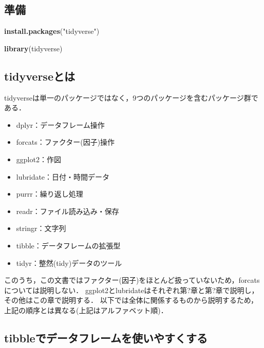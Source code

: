 \documentclass[
]{article}
\newenvironment{Shaded}{\begin{snugshade}}{\end{snugshade}}
\newcommand{\FunctionTok}[1]{\textcolor[rgb]{0.13,0.29,0.53}{\textbf{#1}}}
\newcommand{\NormalTok}[1]{#1}
\newcommand{\StringTok}[1]{\textcolor[rgb]{0.31,0.60,0.02}{#1}}
\providecommand{\tightlist}{%
  \setlength{\itemsep}{0pt}\setlength{\parskip}{0pt}}
\begin{document}
\hypertarget{ux6e96ux5099-1}{%
\subsection{準備}\label{ux6e96ux5099-1}}

\begin{Shaded}
\begin{Highlighting}[]
\FunctionTok{install.packages}\NormalTok{(}\StringTok{"tidyverse"}\NormalTok{)}
\end{Highlighting}
\end{Shaded}

\begin{Shaded}
\begin{Highlighting}[]
\FunctionTok{library}\NormalTok{(tidyverse)}
\end{Highlighting}
\end{Shaded}

\hypertarget{tidyverseux3068ux306f}{%
\subsection{tidyverseとは}\label{tidyverseux3068ux306f}}

tidyverseは単一のパッケージではなく，9つのパッケージを含むパッケージ群である．

\begin{itemize}
\tightlist
\item
  dplyr：データフレーム操作
\item
  forcats：ファクター(因子)操作
\item
  ggplot2：作図
\item
  lubridate：日付・時間データ
\item
  purrr：繰り返し処理
\item
  readr：ファイル読み込み・保存
\item
  stringr：文字列
\item
  tibble：データフレームの拡張型
\item
  tidyr：整然(tidy)データのツール
\end{itemize}

このうち，この文書ではファクター(因子)をほとんど扱っていないため，forcatsについては説明しない．
ggplot2とlubridateはそれぞれ第?章と第?章で説明し，その他はこの章で説明する．
以下では全体に関係するものから説明するため，上記の順序とは異なる(上記はアルファベット順)．

\hypertarget{tibbleux3067ux30c7ux30fcux30bfux30d5ux30ecux30fcux30e0ux3092ux4f7fux3044ux3084ux3059ux304fux3059ux308b}{%
\subsection{tibbleでデータフレームを使いやすくする}\label{tibbleux3067ux30c7ux30fcux30bfux30d5ux30ecux30fcux30e0ux3092ux4f7fux3044ux3084ux3059ux304fux3059ux308b}}
\end{document}
